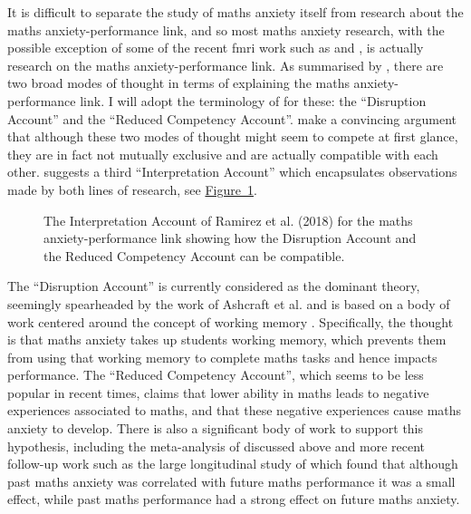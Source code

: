 \documentclass[14pt]{memoir}
\newcommand{\reffig}[1]{\hyperref[fig:#1]{Figure~\ref{fig:#1}}}
\begin{document}
It is difficult to separate the study of maths anxiety itself from research about the maths anxiety-performance link, and so most maths anxiety research, with the possible exception of some of the recent \gls{fmri} work such as  and , is actually research on the maths anxiety-performance link. As summarised by , there are two broad modes of thought in terms of explaining the maths anxiety-performance link. I will adopt the terminology of  for these: the ``Disruption Account'' and the ``Reduced Competency Account''.  make a convincing argument that although these two modes of thought might seem to compete at first glance, they are in fact not mutually exclusive and are actually compatible with each other.  suggests a third ``Interpretation Account'' which encapsulates observations made by both lines of research, see \reffig{ramirez}.

\begin{center}
\begin{figure}
\begin{center}
\end{center}
\caption{The Interpretation Account of Ramirez et al. (2018) for the maths anxiety-performance link showing how the Disruption Account and the Reduced Competency Account can be compatible.
\label{fig:ramirez}}
\end{figure}
\end{center}

The ``Disruption Account'' is currently considered as the dominant theory, seemingly spearheaded by the work of Ashcraft et al. and is based on a body of work centered around the concept of working memory \cite{Ashcraft2001, Ashcraft2007}. Specifically, the thought is that maths anxiety takes up students working memory, which prevents them from using that working memory to complete maths tasks and hence impacts performance. The ``Reduced Competency Account'', which seems to be less popular in recent times, claims that lower ability in maths leads to negative experiences associated to maths, and that these negative experiences cause maths anxiety to develop. There is also a significant body of work to support this hypothesis, including the meta-analysis of  discussed above and more recent follow-up work such as the large longitudinal study of  which found that although past maths anxiety was correlated with future maths performance it was a small effect, while past maths performance had a strong effect on future maths anxiety.
\end{document}
